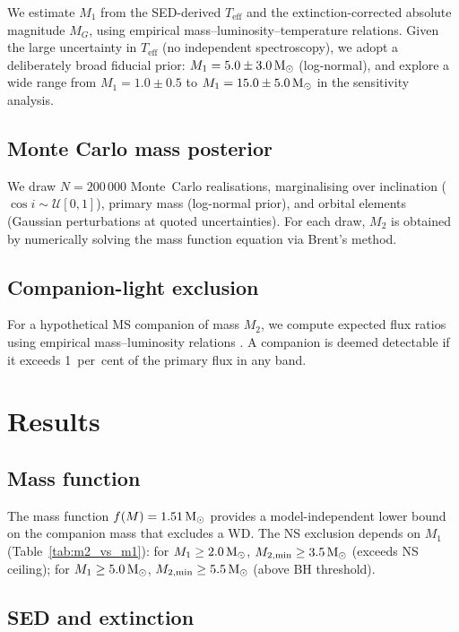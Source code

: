 \documentclass[usenatbib,fleqn]{mnras}
\newcommand{\Msun}{{\rm M}_\odot}
\newcommand{\fmass}{f(M)}
\begin{document}
We estimate $M_1$ from the SED-derived $T_\mathrm{eff}$ and the
extinction-corrected absolute magnitude $M_G$, using empirical
mass--luminosity--temperature relations.  Given the large
uncertainty in $T_\mathrm{eff}$ (no independent spectroscopy), we
adopt a deliberately broad fiducial prior: $M_1 = 5.0 \pm
3.0\,\Msun$ (log-normal), and explore a wide range from
$M_1 = 1.0 \pm 0.5$ to $M_1 = 15.0 \pm 5.0\,\Msun$ in the
sensitivity analysis.

\subsection{Monte Carlo mass posterior}
\label{sec:methods:mc}

We draw $N = 200\,000$ Monte~Carlo realisations, marginalising
over inclination ($\cos i \sim \mathcal{U}[0,1]$), primary mass
(log-normal prior), and orbital elements (Gaussian perturbations
at quoted uncertainties).  For each draw, $M_2$ is obtained by
numerically solving the mass function equation via Brent's method.

\subsection{Companion-light exclusion}
\label{sec:methods:companion}

For a hypothetical MS companion of mass $M_2$, we compute expected
flux ratios using empirical mass--luminosity relations
\citep{Eker2018}.  A companion is deemed detectable if it exceeds
1~per~cent of the primary flux in any band.

\section{Results}
\label{sec:results}

\subsection{Mass function}
\label{sec:results:fm}

The mass function $\fmass = 1.51\,\Msun$ provides a model-independent
lower bound on the companion mass that excludes a WD.  The NS
exclusion depends on $M_1$ (Table~\ref{tab:m2_vs_m1}): for
$M_1 \ge 2.0\,\Msun$, $M_{2,\min} \ge 3.5\,\Msun$ (exceeds NS
ceiling); for $M_1 \ge 5.0\,\Msun$, $M_{2,\min} \ge 5.5\,\Msun$
(above BH threshold).

\subsection{SED and extinction}
\label{sec:results:sed}
\end{document}
